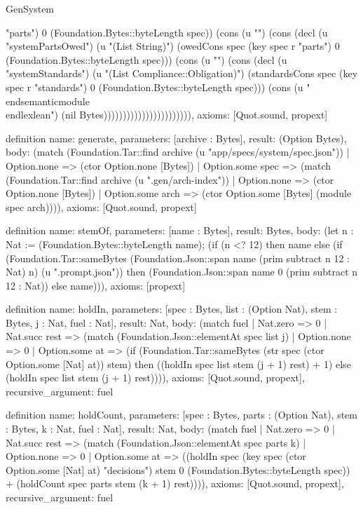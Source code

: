 \begin{lexlean}{GenSystem}
\begin{semanticmodule}
{{"parts") 0 (Foundation.Bytes::byteLength spec)) (cons (u "\n") (cons (decl (u "systemPartsOwed") (u "(List String)") (owedCons spec (key spec r "parts") 0 (Foundation.Bytes::byteLength spec))) (cons (u "\n") (cons (decl (u "systemStandards") (u "(List Compliance::Obligation)") (standardsCons spec (key spec r "standards") 0 (Foundation.Bytes::byteLength spec))) (cons (u "\n\\end{semanticmodule}\n\\end{lexlean}\n") (nil Bytes))))))))))))))))))))))),
  axioms: [Quot.sound, propext]
}

definition{
  name: generate,
  parameters: [archive : Bytes],
  result: (Option Bytes),
  body: (match (Foundation.Tar::find archive (u "app/specs/system/spec.json"))
    | Option.none => (ctor Option.none [Bytes])
    | Option.some spec => (match (Foundation.Tar::find archive (u ".gen/arch-index"))
      | Option.none => (ctor Option.none [Bytes])
      | Option.some arch => (ctor Option.some [Bytes] (module spec arch)))),
  axioms: [Quot.sound, propext]
}

definition{
  name: stemOf,
  parameters: [name : Bytes],
  result: Bytes,
  body: (let n : Nat := (Foundation.Bytes::byteLength name); (if (n <? 12) then name else (if (Foundation.Tar::sameBytes (Foundation.Json::span name (prim subtract n 12 : Nat) n) (u ".prompt.json")) then (Foundation.Json::span name 0 (prim subtract n 12 : Nat)) else name))),
  axioms: [propext]
}

definition{
  name: holdIn,
  parameters: [spec : Bytes, list : (Option Nat), stem : Bytes, j : Nat, fuel : Nat],
  result: Nat,
  body: (match fuel
    | Nat.zero => 0
    | Nat.succ rest => (match (Foundation.Json::elementAt spec list j)
      | Option.none => 0
      | Option.some at => (if (Foundation.Tar::sameBytes (str spec (ctor Option.some [Nat] at)) stem) then ((holdIn spec list stem (j + 1) rest) + 1) else (holdIn spec list stem (j + 1) rest)))),
  axioms: [Quot.sound, propext],
  recursive_argument: fuel
}

definition{
  name: holdCount,
  parameters: [spec : Bytes, parts : (Option Nat), stem : Bytes, k : Nat, fuel : Nat],
  result: Nat,
  body: (match fuel
    | Nat.zero => 0
    | Nat.succ rest => (match (Foundation.Json::elementAt spec parts k)
      | Option.none => 0
      | Option.some at => ((holdIn spec (key spec (ctor Option.some [Nat] at) "decisions") stem 0 (Foundation.Bytes::byteLength spec)) + (holdCount spec parts stem (k + 1) rest)))),
  axioms: [Quot.sound, propext],
  recursive_argument: fuel
}

}
\end{semanticmodule}
\end{lexlean}
